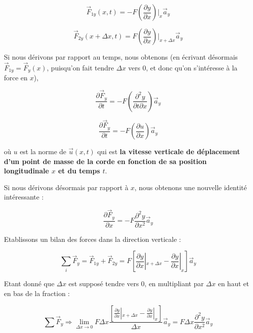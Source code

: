 \begin{equation}
\vec{F}_{1y}(x,t) = - F  (\frac{\partial y}{\partial x})|_{x}  \vec{a}_{y} 
\label{Force1}
\end{equation}

\begin{equation}
\vec{F}_{2y}(x+\Delta x,t) = F (\frac{\partial y}{\partial x})|_{x+\Delta x} \vec{a}_{y}
\label{Force2}
\end{equation}

Si nous dérivons par rapport au temps, nous obtenons (en écrivant désormais $\vec{F}_{1y} = \vec{F}_{y}(x)$, puisqu'on fait tendre $\Delta x$ vers $0$, et donc qu'on s'intéresse à la force en $x$),

\begin{equation}
\frac{\partial \vec{F}_{y}}{\partial t} = - F (\frac{\partial^{2} y}{\partial t \partial x}) \vec{a}_{y}
\label{Force3}
\end{equation}

\begin{equation}
\frac{\partial \vec{F}_{y}}{\partial t} = - F (\frac{\partial u}{\partial x}) \vec{a}_{y}
\label{Force4}
\end{equation}

où $u$ est la norme de $\vec{u}(x,t)$ qui est \textbf{la vitesse verticale de déplacement d'un point de masse de la corde en fonction de sa position longitudinale $x$ et du temps $t$}.

Si nous dérivons désormais par rapport à $x$, nous obtenons une nouvelle identité intéressante : 

\begin{equation}
\frac{\partial \vec{F}_{y}}{\partial x} = -F \frac{\partial^{2} y}{\partial x^{2}} \vec{a}_{y} 
\label{ForceLOL}
\end{equation}

Etablissons un bilan des forces dans la direction verticale : 

\[\sum_{i} \vec{F}_{y} = \vec{F}_{1y} + \vec{F}_{2y}  = F [\frac{\partial y}{\partial x}|_{x+\Delta x} - \frac{\partial y}{\partial x}|_{x}] \vec{a}_{y} \]

Etant donné que $\Delta x$ est supposé tendre vers $0$, en multipliant par $\Delta x$ en haut et en bas de la fraction : 

\begin{equation}
\sum \vec{F}_{y} \Rightarrow \lim_{\Delta x \to 0}  F \Delta x \frac{[\frac{\partial y}{\partial x}|_{x+\Delta x} - \frac{\partial y}{\partial x}|_{x}]}{\Delta x} \vec{a}_{y} = F \Delta x \frac{\partial^{2} y }{\partial x^{2}} \vec{a}_{y} 
\label{Force5}
\end{equation}

